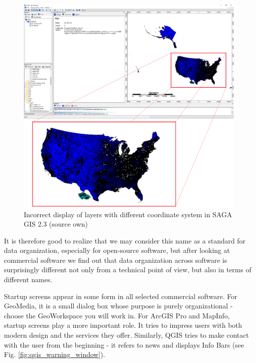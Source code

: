 \documentclass[a4paper,10pt,twoside]{article}
\begin{document}
\newpage
\begin{figure}[hbt!] 
\begin{center}
\includegraphics[width=17cm]{../pictures/saga_gis_cele.png} 
\caption[Incorrect display of layers with different coordinate system in SAGA GIS 2.3 (source own)]{Incorrect display of layers with different coordinate system in SAGA GIS 2.3 (source own)}
\label{fig:saga_gis_cele}
\end{center}
\end{figure}

\noindent It is therefore good to realize that we may consider this name as a standard for data organization, especially for open-source software, but after looking at commercial software we find out that data organization across software is surprisingly different not only from a technical point of view, but also in terms of different names.

Startup screens appear in some form in all selected commercial software. For GeoMedia, it is a small dialog box whose purpose is purely organizational - choose the GeoWorkspace you will work in. For ArcGIS Pro and MapInfo, startup screens play a more important role. It tries to impress users with both modern design and the services they offer. Similarly, QGIS tries to make contact with the user from the beginning - it refers to news and displays Info Bars (see Fig. \ref{fig:qgis_warning_window}).
\end{document}
